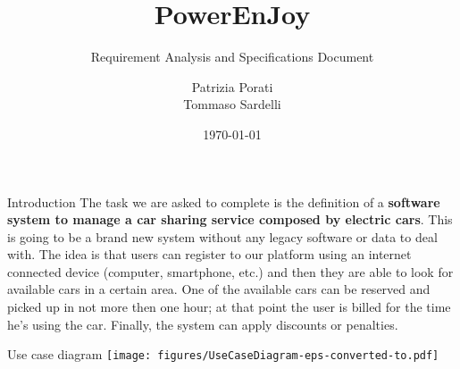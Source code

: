 \documentclass{beamer}
\title{PowerEnJoy}
\subtitle{Requirement Analysis and Specifications Document}
\author{Patrizia Porati \\ Tommaso Sardelli}
\date{\today}
\begin{document}
	
	\begin{frame}
		\maketitle
	\end{frame}

	\begin{frame}
		\frametitle{}
		\begin{block}{Introduction}
			The task we are asked to complete is the definition of a \textbf{software system to manage a car sharing
			service composed by electric cars}. This is going to be a brand new system without any
			legacy software or data to deal with. The idea is that users can register to our platform
			using an internet connected device (computer, smartphone, etc.) and then they are able to
			look for available cars in a certain area. 
			One of the available cars can be reserved and picked up in not more then one hour; at that
			point the user is billed for the time he's using the car.
			Finally, the system can apply discounts or penalties.
		\end{block}
	\end{frame}

	\begin{frame} {Use case diagram}
		\texttt{[image: figures/UseCaseDiagram-eps-converted-to.pdf]}
	\end{frame}
\end{document}
